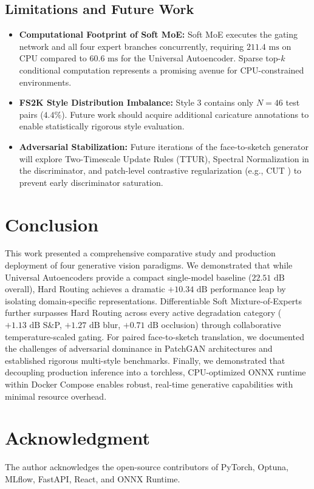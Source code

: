\documentclass[conference]{IEEEtran}
\begin{document}
\subsection{Limitations and Future Work}
\begin{itemize}
    \item \textbf{Computational Footprint of Soft MoE:} Soft MoE executes the gating network and all four expert branches concurrently, requiring $211.4\text{ ms}$ on CPU compared to $60.6\text{ ms}$ for the Universal Autoencoder. Sparse top-$k$ conditional computation represents a promising avenue for CPU-constrained environments.
    \item \textbf{FS2K Style Distribution Imbalance:} Style 3 contains only $N=46$ test pairs ($4.4\%$). Future work should acquire additional caricature annotations to enable statistically rigorous style evaluation.
    \item \textbf{Adversarial Stabilization:} Future iterations of the face-to-sketch generator will explore Two-Timescale Update Rules (TTUR), Spectral Normalization in the discriminator, and patch-level contrastive regularization (e.g., CUT \cite{park2020contrastive}) to prevent early discriminator saturation.
\end{itemize}

\section{Conclusion}
This work presented a comprehensive comparative study and production deployment of four generative vision paradigms. We demonstrated that while Universal Autoencoders provide a compact single-model baseline ($22.51\text{ dB}$ overall), Hard Routing achieves a dramatic $+10.34\text{ dB}$ performance leap by isolating domain-specific representations. Differentiable Soft Mixture-of-Experts further surpasses Hard Routing across every active degradation category ($+1.13\text{ dB}$ S\&P, $+1.27\text{ dB}$ blur, $+0.71\text{ dB}$ occlusion) through collaborative temperature-scaled gating. For paired face-to-sketch translation, we documented the challenges of adversarial dominance in PatchGAN architectures and established rigorous multi-style benchmarks. Finally, we demonstrated that decoupling production inference into a torchless, CPU-optimized ONNX runtime within Docker Compose enables robust, real-time generative capabilities with minimal resource overhead.

\section*{Acknowledgment}
The author acknowledges the open-source contributors of PyTorch, Optuna, MLflow, FastAPI, React, and ONNX Runtime.
\end{document}
